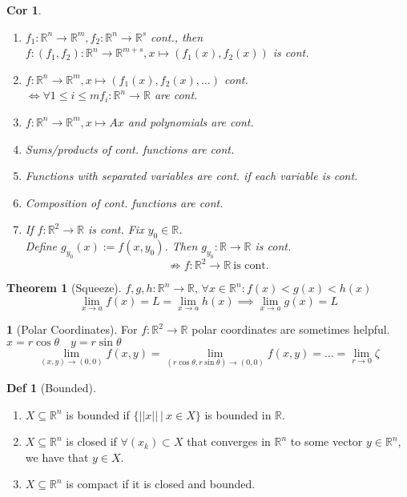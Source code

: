 \documentclass[a4paper, 10pt]{article}
\newtheorem*{corollary}{Cor}
\theoremstyle{definition}
\newtheorem*{definition}{Def}
\theoremstyle{colored}
\newtheorem*{note_wrapper}{}
\theoremstyle{ex}
\theoremstyle{named}
\newtheorem*{ntheorem_wrapper}{Theorem}
\newenvironment{ntheorem}%
    {\begin{mdframed}[style=important]\begin{ntheorem_wrapper}}%
    {\end{ntheorem_wrapper}\end{mdframed}}
\newenvironment{note}%
    {\begin{mdframed}[style=trick]\begin{note_wrapper}}%
    {\end{note_wrapper}\end{mdframed}}
\newcommand{\R}{\mathbb{R}}
\begin{document}
\begin{corollary}
    \begin{enumerate}
        \item \(f_1: \R^n \to \R^m, f_2: \R^n \to \R^s\) cont., then \(f: (f_1, f_2): \R^n \to \R^{m + s}, x \mapsto (f_1(x), f_2(x))\) is cont.
        \item \(f: \R^n \to \R^m, x \mapsto (f_1(x), f_2(x), \ldots)\) cont.\\  \(\iff  \forall 1 \leq i \leq m f_i: \R^n \to \R\) are cont.
        \item \(f: \R^n \to \R^m, x \mapsto Ax\) and polynomials are cont.
        \item Sums/products of cont. functions are cont.
        \item Functions with separated variables are cont. if each variable is cont.
        \item Composition of cont. functions are cont.
        \item If \(f: \R^2 \to \R\) is cont. Fix \(y_0 \in \R\). \\ Define \(g_{y_0}(x) := f(x, y_0)\). Then \(g_{y_0}: \R \to \R\) is cont.
        \[\not\Rightarrow f: \R^2 \to \R \ \text{is cont.}\]
    \end{enumerate}
\end{corollary}

\begin{ntheorem}[Squeeze]
    \(f, g, h : \R^n \to \R\), \(\forall x \in \R^n: f(x) < g(x) < h(x)\)
    \[\lim_{x \to a} f(x) = L = \lim_{x \to a} h(x) \implies \lim_{x \to a}g(x) = L\]
\end{ntheorem}

\begin{note}[Polar Coordinates]
    For \(f: \R^2 \to \R\) polar coordinates are sometimes helpful.
    \(x = r \cos \theta \quad y = r \sin \theta\)
    \[\lim_{(x, y) \to (0, 0)}f(x, y) = \lim_{(r\cos\theta, r\sin\theta)  \to (0,0)}f(x, y) = \ldots = \lim_{r \to 0} \zeta\]
\end{note}

\begin{definition}[Bounded]
    \begin{enumerate}
        \item \(X \subseteq \R^n\) is bounded if \(\{||x|| \ | \ x \in X\}\) is bounded in \(\R\).
        \item \(X \subseteq \R^n\) is closed if \(\forall (x_k) \subset X\) that converges in \(\R^n\) to some vector \(y \in \R^n\), we have that \(y \in X\).
        \item \(X \subseteq \R^n\) is compact if it is closed and bounded.
    \end{enumerate}
\end{definition}
\end{document}
